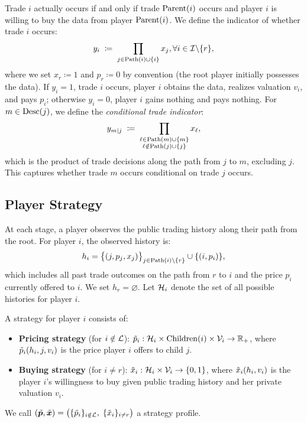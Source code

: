 Trade $i$ actually occurs if and only if trade $\operatorname{Parent}(i)$ occurs and player $i$ is willing to buy the data from player $\operatorname{Parent}(i)$. We define the indicator of whether trade $i$ occurs:
\begin{equation}
\label{eq:yi}
y_i \;\coloneqq\; \prod_{j \in \operatorname{Path}(i) \cup \{i\}} x_j, \forall i \in \mathcal{I} \backslash\{r\},
\end{equation}
where we set $x_r \coloneqq 1$ and $p_r \coloneqq 0$ by convention (the root player initially possesses the data).
If $y_i = 1$, trade $i$ occurs, player $i$ obtains the data, realizes valuation $v_i$, and pays $p_i$; otherwise $y_i = 0$, player $i$ gains nothing and pays nothing. For $m \in \operatorname{Desc}(j)$, we define the \emph{conditional trade indicator}:
\begin{equation}
\label{eq:y-conditional}
y_{m \mid j} \;\coloneqq\; \prod_{\substack{\ell \in \operatorname{Path}(m) \cup \{m\} \\ \ell \notin \operatorname{Path}(j) \cup \{j\}}} x_\ell,
\end{equation}
which is the product of trade decisions along the path from $j$ to $m$, excluding $j$. This captures whether trade $m$ occurs conditional on trade $j$ occurs.


\subsection{Player Strategy}
\label{subsec:strategy}

At each stage, a player observes the public trading history along their path from the root. For player $i$, the observed history is:
\begin{equation}
\label{eq:hi}
h_i = \big\{(j, p_j, x_j)\big\}_{j \in \operatorname{Path}(i) \setminus \{r\}} \cup \{(i, p_i)\},
\end{equation}
which includes all past trade outcomes on the path from $r$ to $i$ and the price $p_i$ currently offered to $i$. We set $h_r = \varnothing$. Let $\mathcal{H}_i$ denote the set of all possible histories for player $i$.

A strategy for player $i$ consists of:
\begin{itemize}[left=0em]
\item \textbf{Pricing strategy} (for $i \notin \mathcal{L}$): $\tilde{p}_i: \mathcal{H}_i \times \operatorname{Children}(i) \times \mathcal{V}_i \to \mathbb{R}_+$, where $\tilde{p}_i(h_i, j, v_i)$ is the price player $i$ offers to child $j$.
\item \textbf{Buying strategy} (for $i \neq r$): $\tilde{x}_i: \mathcal{H}_i \times \mathcal{V}_i \to \{0, 1\}$, where $\tilde{x}_i(h_i, v_i)$ is the player $i$'s willingness to buy given public trading history and her private valuation $v_i$.
\end{itemize}
We call $(\tilde{{\bm{p}}}, \tilde{{\bm{x}}}) = \big(\{\tilde{p}_i\}_{i \notin \mathcal{L}},\; \{\tilde{x}_i\}_{i \neq r}\big)$ a strategy profile.


